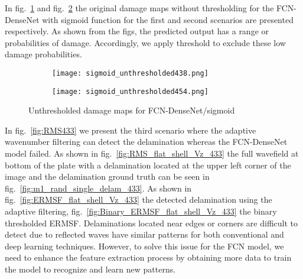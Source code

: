 	In fig.~\ref{fig:unthresholded438} and fig.~\ref{fig:unthresholded454} the original damage maps without thresholding for the FCN-DenseNet with sigmoid function for the first and second scenarios are presented respectively. 
	As shown from the figs, the predicted output has a range or probabilities of damage. 
	Accordingly, we apply threshold to exclude these low damage probabilities.
	\begin{figure} [H] 
		\centering
		\begin{subfigure}[b]{0.47\textwidth}
		\centering
		\texttt{[image: sigmoid\_unthresholded438.png]}
		\caption{}
		\label{fig:unthresholded438}
		\end{subfigure}
	\hfill	
	\begin{subfigure}[b]{0.47\textwidth}
		\centering 	
		\texttt{[image: sigmoid\_unthresholded454.png]}
		\caption{}
		\label{fig:unthresholded454}
	\end{subfigure}
	\caption{Unthresholded damage maps for FCN-DenseNet/sigmoid}
	\label{fig:unthresholded}
	\end{figure}
	In fig.~\ref{fig:RMS433} we present the third scenario where the adaptive wavenumber filtering can detect the delamination whereas the FCN-DenseNet model failed.
	As shown in fig.~\ref{fig:RMS_flat_shell_Vz_433} the full wavefield at bottom of the plate with a delamination located at the upper left corner of the image
	and the delamination ground truth can be seen in fig.~\ref{fig:m1_rand_single_delam_433}. 
	As shown in fig.~\ref{fig:ERMSF_flat_shell_Vz_433} the detected delamination using the adaptive filtering, fig.~\ref{fig:Binary_ERMSF_flat_shell_Vz_433} the binary thresholded ERMSF. 
	Delaminations located near edges or corners are difficult to detect due to reflected waves have similar patterns for both conventional and deep learning techniques. 
	However, to solve this issue for the FCN model, we need to enhance the feature extraction process by obtaining more data to train the model to recognize and learn new patterns.	
